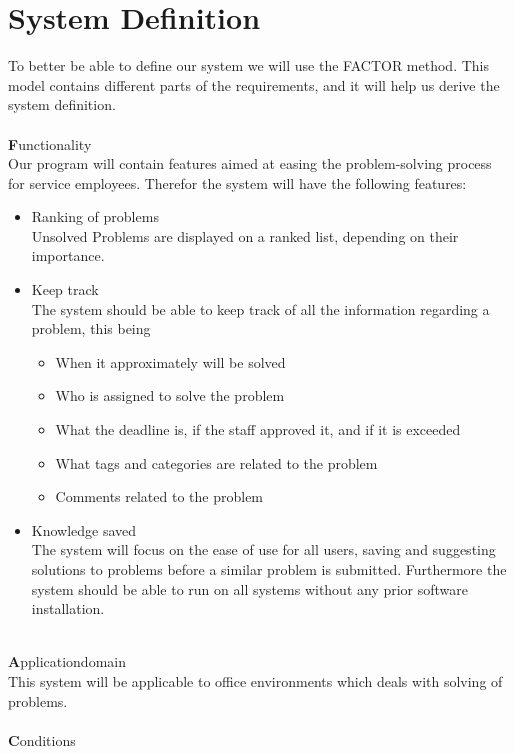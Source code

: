 \section{System Definition}
\label{sec:factor}
To better be able to define our system we will use the FACTOR method\cite[p. 39]{roedeaalborg}. This model contains different parts of the requirements, and it will help us derive the system definition.  \\
\ \\
{\Large \textbf{F}}unctionality \\
Our program will contain features aimed at easing the problem-solving process for service employees. Therefor the system will have the following features:
\begin{itemize}
\item Ranking of problems \\
Unsolved Problems are displayed on a ranked list, depending on their importance.
\item Keep track \\
The system should be able to keep track of all the information regarding a problem, this being
\begin{itemize}
	\item When it approximately will be solved
	\item Who is assigned to solve the problem
	\item What the deadline is, if the staff approved it, and if it is exceeded
	\item What tags and categories are related to the problem 
	\item Comments related to the problem
\end{itemize}
\item Knowledge saved \\
The system will focus on the ease of use for all users, saving and suggesting solutions to problems before a similar problem is submitted. Furthermore the system should be able to run on all systems without any prior software installation.
\end{itemize}
\ \\
{\Large \textbf{A}}pplicationdomain \\
This system will be applicable to office environments which deals with solving of problems.\\
\ \\
{\Large \textbf{C}}onditions \\ 
